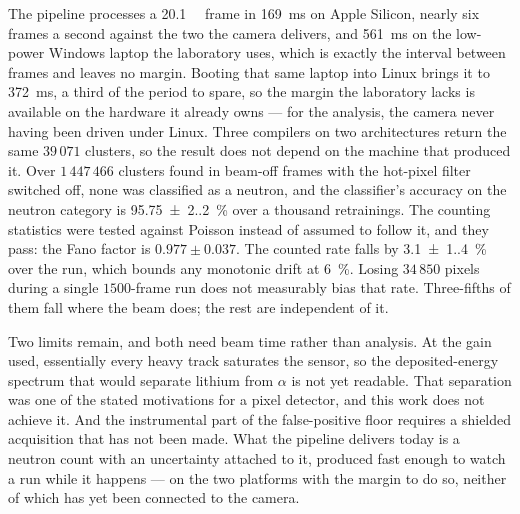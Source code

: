 \documentclass[a4paper,headsepline,oneside,11pt]{scrartcl}
\begin{document}
The pipeline processes a \SI{20.1}{\mega\pixel} frame in \SI{169}{\milli\second} on Apple Silicon, nearly
six frames a second against the two the camera delivers, and \SI{561}{\milli\second} on the
low-power Windows laptop the laboratory uses, which is exactly the interval
between frames and leaves no margin. Booting that same laptop into Linux brings
it to \SI{372}{\milli\second}, a third of the period to spare, so the margin the
laboratory lacks is available on the hardware it already owns --- for the
analysis, the camera never having been driven under Linux. Three compilers
on two architectures return the same $39\,071$ clusters, so the result does not
depend on the machine that produced it. Over $1\,447\,466$ clusters found in beam-off frames with the
hot-pixel filter switched off, none was classified as a neutron, and the
classifier's accuracy on the neutron category is \SI{95.75(2.20)}{\percent} over a
thousand retrainings. The counting statistics were tested against Poisson
instead of assumed to follow it, and they pass: the Fano factor is
$0.977 \pm 0.037$. The counted rate falls by \SI{3.1(1.4)}{\percent} over the run,
which bounds any monotonic drift at \SI{6}{\percent}. Losing $34\,850$ pixels during a
single $1500$-frame run does not measurably bias that rate. Three-fifths of
them fall where the beam does; the rest are independent of it.

Two limits remain, and both need beam time rather than analysis. At the gain
used, essentially every heavy track saturates the sensor, so the deposited-energy
spectrum that would separate lithium from $\alpha$ is not yet readable. That
separation was one of the stated motivations for a pixel detector, and this work
does not achieve it. And the
instrumental part of the false-positive floor requires a shielded acquisition
that has not been made. What the pipeline delivers today is a neutron count with
an uncertainty attached to it, produced fast enough to watch a run while it
happens --- on the two platforms with the margin to do so, neither of which has
yet been connected to the camera.
\newpage
\begingroup
{}
\tableofcontents
\endgroup
\clearpage
\end{document}
